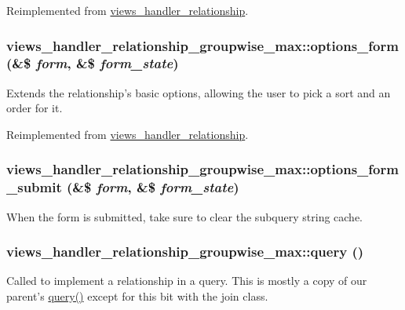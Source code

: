 Reimplemented from \hyperlink{classviews__handler__relationship}{views\_\-handler\_\-relationship}.\hypertarget{classviews__handler__relationship__groupwise__max_a9cac8b627e41265e500d1a36f4d8f621}{
\subsubsection[{options\_\-form}]{\setlength{\rightskip}{0pt plus 5cm}views\_\-handler\_\-relationship\_\-groupwise\_\-max::options\_\-form (\&\$ {\em form}, \/  \&\$ {\em form\_\-state})}}
\label{classviews__handler__relationship__groupwise__max_a9cac8b627e41265e500d1a36f4d8f621}
Extends the relationship's basic options, allowing the user to pick a sort and an order for it. 

Reimplemented from \hyperlink{classviews__handler__relationship_a08cc3f5947964d936b5e88d198f82c30}{views\_\-handler\_\-relationship}.\hypertarget{classviews__handler__relationship__groupwise__max_a33dd614a3c4506afe9a3746712713724}{
\subsubsection[{options\_\-form\_\-submit}]{\setlength{\rightskip}{0pt plus 5cm}views\_\-handler\_\-relationship\_\-groupwise\_\-max::options\_\-form\_\-submit (\&\$ {\em form}, \/  \&\$ {\em form\_\-state})}}
\label{classviews__handler__relationship__groupwise__max_a33dd614a3c4506afe9a3746712713724}
When the form is submitted, take sure to clear the subquery string cache. \hypertarget{classviews__handler__relationship__groupwise__max_a26fd71d0c45deea3dcd04e40fe58df7c}{
\subsubsection[{query}]{\setlength{\rightskip}{0pt plus 5cm}views\_\-handler\_\-relationship\_\-groupwise\_\-max::query ()}}
\label{classviews__handler__relationship__groupwise__max_a26fd71d0c45deea3dcd04e40fe58df7c}
Called to implement a relationship in a query. This is mostly a copy of our parent's \hyperlink{classviews__handler__relationship__groupwise__max_a26fd71d0c45deea3dcd04e40fe58df7c}{query()} except for this bit with the join class. 

